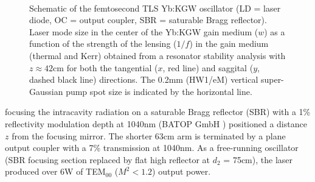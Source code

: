 \begin{figure}
  \centering
  \subfloat[][]{
    \label{fig:laser_schematic}
    
  }
  \\
  \caption{
    \protect{} Schematic of the femtosecond TLS Yb:KGW oscillator (LD = laser diode, OC = output coupler, SBR = saturable Bragg reflector).
    \protect{} Laser mode size in the center of the Yb:KGW gain medium ($w$) as a function of the strength of the lensing ($1/f$) in the gain medium (thermal and Kerr) obtained from a resonator stability analysis with $z \approx 42$cm for both the tangential ($x$, red line) and saggital ($y$, dashed black line) directions.
    The 0.2mm (HW1/eM) vertical super-Gaussian pump spot size is indicated by the horizontal line.
  }
  \label{fig:laser-cavity}
\end{figure}

focusing the intracavity radiation on a saturable Bragg reflector (SBR) with a 1\% reflectivity modulation depth at 1040nm (BATOP GmbH \cite{website_BATOP}) positioned a distance $z$ from the focusing mirror.
The shorter 63cm arm is terminated by a plane output coupler with a 7\% transmission at 1040nm.
As a free-running oscillator (SBR focusing section replaced by flat high reflector at $d_2$ = 75cm), the laser produced over 6W of TEM$_{00}$ ($M^2 < 1.2$) output power.

